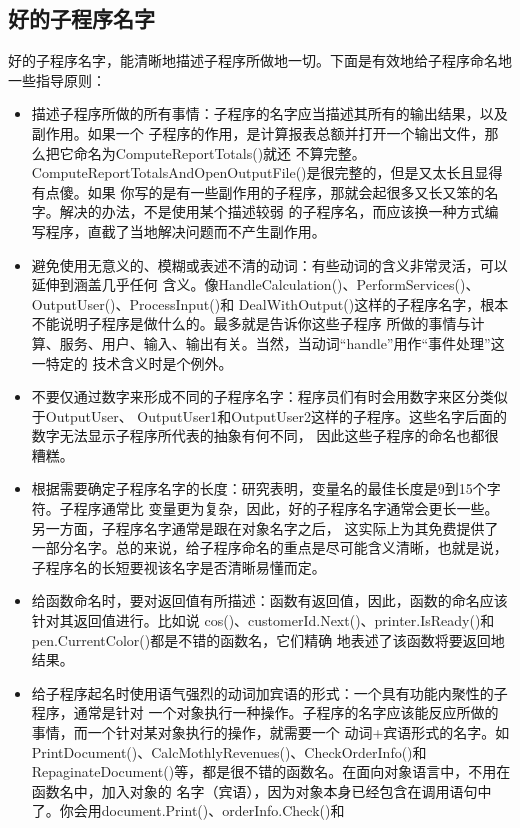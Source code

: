 \documentclass{article}
\begin{document}
\subsection{好的子程序名字}
好的子程序名字，能清晰地描述子程序所做地一切。下面是有效地给子程序命名地一些指导原则：
\begin{itemize}
    \item 描述子程序所做的所有事情：子程序的名字应当描述其所有的输出结果，以及副作用。如果一个
    子程序的作用，是计算报表总额并打开一个输出文件，那么把它命名为ComputeReportTotals()就还
    不算完整。ComputeReportTotalsAndOpenOutputFile()是很完整的，但是又太长且显得有点傻。如果
    你写的是有一些副作用的子程序，那就会起很多又长又笨的名字。解决的办法，不是使用某个描述较弱
    的子程序名，而应该换一种方式编写程序，直截了当地解决问题而不产生副作用。
    \item 避免使用无意义的、模糊或表述不清的动词：有些动词的含义非常灵活，可以延伸到涵盖几乎任何
    含义。像HandleCalculation()、PerformServices()、OutputUser()、ProcessInput()和
    DealWithOutput()这样的子程序名字，根本不能说明子程序是做什么的。最多就是告诉你这些子程序
    所做的事情与计算、服务、用户、输入、输出有关。当然，当动词“handle”用作“事件处理”这一特定的
    技术含义时是个例外。
    \item 不要仅通过数字来形成不同的子程序名字：程序员们有时会用数字来区分类似于OutputUser、
    OutputUser1和OutputUser2这样的子程序。这些名字后面的数字无法显示子程序所代表的抽象有何不同，
    因此这些子程序的命名也都很糟糕。
    \item 根据需要确定子程序名字的长度：研究表明，变量名的最佳长度是9到15个字符。子程序通常比
    变量更为复杂，因此，好的子程序名字通常会更长一些。另一方面，子程序名字通常是跟在对象名字之后，
    这实际上为其免费提供了一部分名字。总的来说，给子程序命名的重点是尽可能含义清晰，也就是说，
    子程序名的长短要视该名字是否清晰易懂而定。
    \item 给函数命名时，要对返回值有所描述：函数有返回值，因此，函数的命名应该针对其返回值进行。比如说
    cos()、customerId.Next()、printer.IsReady()和pen.CurrentColor()都是不错的函数名，它们精确
    地表述了该函数将要返回地结果。
    \item 给子程序起名时使用语气强烈的动词加宾语的形式：一个具有功能内聚性的子程序，通常是针对
    一个对象执行一种操作。子程序的名字应该能反应所做的事情，而一个针对某对象执行的操作，就需要一个
    动词+宾语形式的名字。如PrintDocument()、CalcMothlyRevenues()、CheckOrderInfo()和
    RepaginateDocument()等，都是很不错的函数名。在面向对象语言中，不用在函数名中，加入对象的
    名字（宾语），因为对象本身已经包含在调用语句中了。你会用document.Print()、orderInfo.Check()和

\end{itemize}
\end{document}

